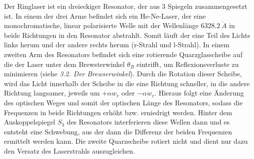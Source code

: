 Der Ringlaser ist ein dreieckiger Resonator, der aus 3 Spiegeln zusammengesetzt ist. In einem der drei Arme befindet sich ein He-Ne-Laser, der eine monochromatische, linear polarisierte Welle mit der Wellenlänge $6328.2 \ \mathring A$ in beide Richtungen in den Resonator abstrahlt. Somit läuft der eine Teil des Lichts links herum und der andere rechts herum (r-Strahl und l-Strahl). In einem zweiten Arm des Resonators befindet sich eine rotierende Quarzglasscheibe auf die der Laser unter dem Brewsterwinkel $\theta_B$ eintrifft, um Reflexionsverluste zu minimieren (siehe \emph{3.2. Der Brewserwinkel}). Durch die Rotation dieser Scheibe, wird das Licht innerhalb der Scheibe in die eine Richtung schneller, in die andere Richtung langsamer, jeweils um $+\alpha w_r$ oder $-\alpha w_r$. Hieraus folgt eine Änderung des optischen Weges und somit der optischen Länge des Resonators, sodass die Frequenzen in beide Richtungen erhöht bzw. erniedrigt werden. Hinter dem Auskoppelspiegel $S_3$ des Resonators interferieren diese Wellen dann und es entsteht eine Schwebung, aus der dann die Differenz der beiden Frequenzen ermittelt werden kann. Die zweite Quarzscheibe rotiert nicht und dient nur dazu den Versatz des Laserstrahls auszugleichen.
